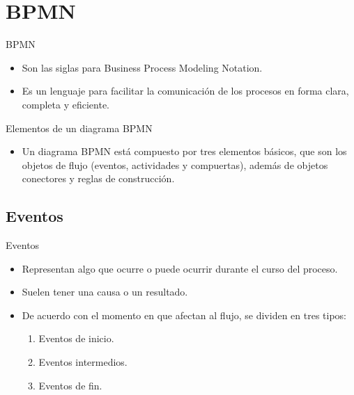 \section{BPMN}

\begin{frame}{BPMN}
    \begin{itemize}
        \item Son las siglas para Business Process Modeling Notation.
	    \item Es un lenguaje para facilitar la comunicación de los procesos en forma clara, completa y eficiente.
	\end{itemize}
\end{frame}

\begin{frame}{Elementos de un diagrama BPMN}
    \begin{itemize}
        \item Un diagrama BPMN está compuesto por tres elementos básicos, que son los objetos de flujo (eventos, actividades y compuertas), además de objetos conectores y reglas de construcción. 
    \end{itemize}
\end{frame}

\subsection{Eventos}

\begin{frame}{Eventos}
    \begin{itemize}
        \item Representan algo que ocurre o puede ocurrir durante el curso del proceso.
        \item Suelen tener una causa o un resultado.
        \item De acuerdo con el momento en que afectan al flujo, se dividen en tres tipos:
        \begin{enumerate}
            \item Eventos de inicio.
            \item Eventos intermedios.
            \item Eventos de fin.
        \end{enumerate}
    \end{itemize}
\end{frame}

